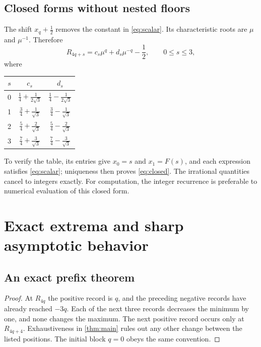 \documentclass[11pt]{article}
\newtheorem{corollary}[theorem]{Corollary}
\theoremstyle{definition}
\numberwithin{equation}{section}
\begin{document}
\subsection{Closed forms without nested floors}
The shift $x_q+\tfrac12$ removes the constant in \eqref{eq:scalar}. Its characteristic roots are $\mu$ and $\mu^{-1}$. Therefore
\begin{equation}\label{eq:closed}
 \boxed{R_{4q+s}=c_s\mu^q+d_s\mu^{-q}-\frac12,\qquad0\le s\le3,}
\end{equation}
where
\begin{center}
\begin{tabular}{c|cc}
\toprule
$s$&$c_s$&$d_s$\\
\midrule
0&$\frac14+\frac1{2\sqrt3}$&$\frac14-\frac1{2\sqrt3}$\\[3pt]
1&$\frac34+\frac1{\sqrt3}$&$\frac34-\frac1{\sqrt3}$\\[3pt]
2&$\frac54+\frac2{\sqrt3}$&$\frac54-\frac2{\sqrt3}$\\[3pt]
3&$\frac74+\frac3{\sqrt3}$&$\frac74-\frac3{\sqrt3}$\\
\bottomrule
\end{tabular}
\end{center}
To verify the table, its entries give $x_0=s$ and $x_1=F(s)$, and each expression satisfies \eqref{eq:scalar}; uniqueness then proves \eqref{eq:closed}. The irrational quantities cancel to integers exactly. For computation, the integer recurrence is preferable to numerical evaluation of this closed form.

\section{Exact extrema and sharp asymptotic behavior}\label{sec:asymptotics}
\subsection{An exact prefix theorem}
\begin{proof}
At $R_{4q}$ the positive record is $q$, and the preceding negative records have already reached $-3q$. Each of the next three records decreases the minimum by one, and none changes the maximum. The next positive record occurs only at $R_{4q+4}$. Exhaustiveness in \cref{thm:main} rules out any other change between the listed positions. The initial block $q=0$ obeys the same convention.
\end{proof}
\end{document}
